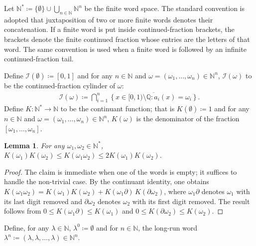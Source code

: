 \documentclass[10pt,a4paper]{amsart}
\newtheorem{lemma}{Lemma}
\begin{document}
Let $\mathbb{N}^*\coloneqq\{\emptyset\}\cup\bigcup_{n\in\mathbb{N}}\mathbb{N}^n$ be the finite word space. The standard convention is adopted that juxtaposition of two or more finite words denotes their concatenation. If a finite word is put inside continued-fraction brackets, the brackets denote the finite continued fraction whose entries are the letters of that word. The same convention is used when a finite word is followed by an infinite continued-fraction tail.

Define $\mathcal{I}(\emptyset)\coloneqq[0,1]$ and for any $n\in\mathbb{N}$ and $\omega=(\omega_1,\dots,\omega_n)\in\mathbb{N}^n$, $\mathcal{I}(\omega)$ to be the continued-fraction cylinder of $\omega$:
\begin{align*}
    \mathcal{I}(\omega)
    \coloneqq
    \bigcap_{i=1}^n\overline{\left\{x\in[0,1)\setminus\mathbb{Q}:
    a_i(x)=\omega_i\right\}}.
\end{align*}
Define $K:\mathbb{N}^*\to\mathbb{N}$ to be the continuant function; that is $K(\emptyset)\coloneqq1$ and for any $n\in\mathbb{N}$ and $\omega=(\omega_1,\dots,\omega_n)\in\mathbb{N}^n$, $K(\omega)$ is the denominator of the fraction $[\omega_1,\ldots,\omega_n]$.

\begin{lemma}
\label{lem:continuant-concatenation}
For any $\omega_1,\omega_2\in\mathbb{N}^*$, $K(\omega_1)K(\omega_2)\leq K(\omega_1\omega_2)\leq 2K(\omega_1)K(\omega_2)$.
\end{lemma}
\begin{proof}
The claim is immediate when one of the words is empty; it suffices to handle the non-trivial case. By the continuant identity, one obtains $K(\omega_1\omega_2)=K(\omega_1)K(\omega_2)+K({\omega_{1}}\partial)\,K(\partial\omega_2)$,
where ${\omega_1}\partial$ denotes $\omega_1$ with its last digit removed and $\partial\omega_2$ denotes $\omega_2$ with its first digit removed. The result follows from $0\leq K({\omega_1}\partial)\leq K(\omega_1)$ and $0\leq K(\partial\omega_2)\leq K(\omega_2)$.
\end{proof}

Define, for any $\lambda\in\mathbb{N}$, $\lambda^0\coloneqq\emptyset$ and for $n\in\mathbb{N}$, the long-run word $\lambda^n\coloneqq(\lambda,\lambda,\ldots,\lambda)\in\mathbb{N}^n$.
\end{document}
